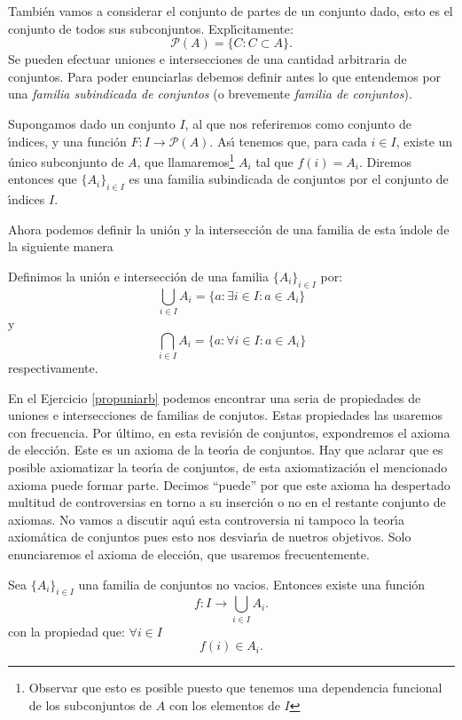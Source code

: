 Tambi\'en vamos a considerar el conjunto de partes de un conjunto
dado, esto es el conjunto de todos sus subconjuntos.
Expl\'{\i}citamente:
\[\mathcal{P}(A)=\{C:C\subset A\}.\]
Se pueden efectuar uniones e intersecciones de una cantidad
arbitraria de conjuntos. Para poder enunciarlas debemos definir
antes lo que entendemos por una \emph{familia subindicada de
conjuntos} (o brevemente \emph{familia de conjuntos}).

\begin{definicion} Supongamos dado un conjunto $I$, al que nos referiremos como
conjunto de \'{\i}ndices, y una funci\'on $F:I\longrightarrow
\mathcal{P}(A)$. As\'{\i} tenemos que, para cada $i\in I$, existe
un \'unico subconjunto de $A$, que llamaremos\footnote{Observar
que esto es posible puesto que tenemos una dependencia funcional
de los subconjuntos de $A$ con los elementos de $I$} $A_i$ tal que
$f(i)=A_i$. Diremos entonces que $\{A_i\}_{i\in I}$ es una familia
subindicada de conjuntos por el conjunto de \'{\i}ndices $I$.
\end{definicion}

Ahora podemos definir la uni\'on y la intersecci\'on de una
familia de esta \'{\i}ndole de la siguiente manera
\begin{definicion} Definimos la uni\'on e intersecci\'on de una
familia $\{A_i\}_{i\in I}$ por:
\[\bigcup_{i\in I}A_i=\{a:\exists i\in I:a\in A_i\}\]
y
\[\bigcap_{i\in I}A_i=\{a:\forall i\in I:a\in A_i\}\]
respectivamente.
\end{definicion}
En el Ejercicio \vref{propuniarb} podemos encontrar una seria de
propiedades de uniones e intersecciones de familias de conjutos.
Estas propiedades las usaremos con frecuencia.
 Por \'ultimo, en esta revisi\'on de conjuntos, expondremos el
 axioma de elecci\'on. Este es un axioma de la teor\'{\i}a de
 conjuntos. Hay que aclarar que es posible axiomatizar la
 teor\'{\i}a de conjuntos, de esta axiomatizaci\'on el mencionado axioma
 puede formar parte. Decimos ``puede'' por que este
 axioma ha despertado multitud de controversias en torno a su
 inserci\'on o no en el restante conjunto de axiomas. No vamos a
 discutir aqu\'{\i} esta controversia ni tampoco la teor\'{\i}a
 axiom\'atica de conjuntos pues esto nos desviar\'{\i}a de nuetros
 objetivos. Solo enunciaremos el axioma de elecci\'on, que
 usaremos frecuentemente.

\begin{axioma} Sea $\{A_i\}_{i\in I}$ una familia de conjuntos no
vacios. Entonces existe una funci\'on
\[f:I\longrightarrow\bigcup_{i\in I}A_i.\]
con la propiedad  que: $\forall i\in I$
\[f(i)\in A_i.\]
\end{axioma}



